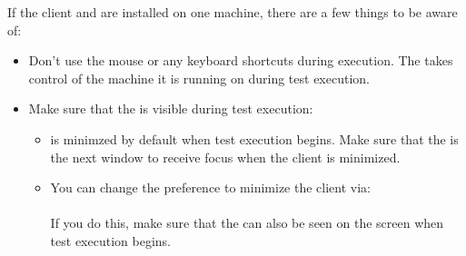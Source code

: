 

If the \jb{} client and \gdserver are installed on one machine, there are a few things to be aware of:
\begin{itemize}
\item Don't use the mouse or any keyboard shortcuts during execution. The \gdaut{} takes control of the machine it is running on during test execution.
\item Make sure that the \gdaut{} is visible during test execution:
\begin{itemize}
\item \jb{}is minimzed by default when test execution begins. Make sure that the \gdaut{} is the next window to receive focus when the client is minimized. 
\item You can change the preference to minimize the client via:\\
\\
If you do this, make sure that the \gdaut{} can also be seen on the screen when test execution begins. 
 \end{itemize}
\end{itemize}

